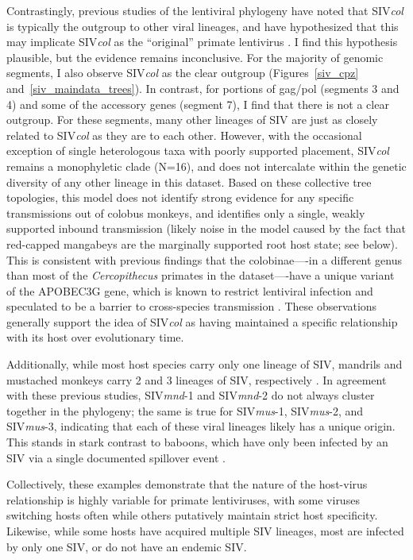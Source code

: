 Contrastingly, previous studies of the lentiviral phylogeny have noted that SIV\textit{col} is typically the outgroup to other viral lineages, and have hypothesized that this may implicate SIV\textit{col} as the “original” primate lentivirus \citep{compton2013convergence}.
I find this hypothesis plausible, but the evidence remains inconclusive.
For the majority of genomic segments, I also observe SIV\textit{col} as the clear outgroup (Figures~\ref{siv_cpz} and~\ref{siv_maindata_trees}).
In contrast, for portions of gag/pol (segments 3 and 4) and some of the accessory genes (segment 7), I find that there is not a clear outgroup.
For these segments, many other lineages of SIV are just as closely related to SIV\textit{col} as they are to each other.
However, with the occasional exception of single heterologous taxa with poorly supported placement, SIV\textit{col} remains a monophyletic clade (N=16), and does not intercalate within the genetic diversity of any other lineage in this dataset.
Based on these collective tree topologies, this model does not identify strong evidence for any specific transmissions out of colobus monkeys, and identifies only a single, weakly supported inbound transmission (likely noise in the model caused by the fact that red-capped mangabeys are the marginally supported root host state; see below).
This is consistent with previous findings that the colobinae—-in a different genus than most of the \textit{Cercopithecus} primates in the dataset—-have a unique variant of the APOBEC3G gene, which is known to restrict lentiviral infection and speculated to be a barrier to cross-species transmission \citep{compton2013convergence}.
These observations generally support the idea of SIV\textit{col} as having maintained a specific relationship with its host over evolutionary time.

Additionally, while most host species carry only one lineage of SIV, mandrils and mustached monkeys carry 2 and 3 lineages of SIV, respectively \citep{aghokeng2007full,courgnaud2003identification,liegeois2012new,souquiere2001wild}.
In agreement with these previous studies, SIV\textit{mnd}-1 and SIV\textit{mnd}-2 do not always cluster together in the phylogeny; the same is true for SIV\textit{mus}-1, SIV\textit{mus}-2, and SIV\textit{mus}-3, indicating that each of these viral lineages likely has a unique origin.
This stands in stark contrast to baboons, which have only been infected by an SIV via a single documented spillover event \citep{jin1994infection}.

Collectively, these examples demonstrate that the nature of the host-virus relationship is highly variable for primate lentiviruses, with some viruses switching hosts often while others putatively maintain strict host specificity.
Likewise, while some hosts have acquired multiple SIV lineages, most are infected by only one SIV, or do not have an endemic SIV.

